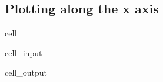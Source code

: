 \documentclass[letterpaper,10pt,english]{jupyterBook}
\begin{document}
\subsection{Plotting along the x axis}
\label{\detokenize{content/1_mechanics/dynamical_1:plotting-along-the-x-axis}}
\begin{sphinxuseclass}{cell}\begin{sphinxVerbatimInput}

\begin{sphinxuseclass}{cell_input}
\begin{sphinxVerbatim}[commandchars=\\\{\}]
  

  
  

  
\end{sphinxVerbatim}

\end{sphinxuseclass}\end{sphinxVerbatimInput}
\begin{sphinxVerbatimOutput}

\begin{sphinxuseclass}{cell_output}
\noindent{}

\end{sphinxuseclass}\end{sphinxVerbatimOutput}

\end{sphinxuseclass}
\end{document}
